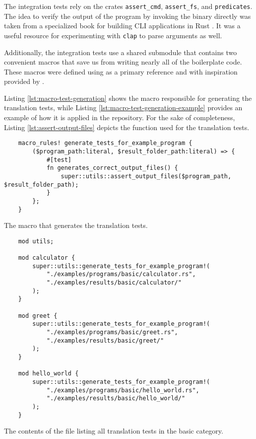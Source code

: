The integration tests rely on the crates \texttt{assert\_cmd}, \texttt{assert\_fs},
and \texttt{predicates}.
The idea to verify the output of the program by invoking the binary directly was
taken from a specialized book for building \acrshort{CLI} applications in Rust \cite[Chap. 1.6]{rust-cli-book}.
It was a useful resource for experimenting with \texttt{clap} to parse arguments as well.

Additionally, the integration tests use a shared submodule \cite[Chap. 11.3]{rust-book}
that contains two convenient macros that save us from writing nearly all of the boilerplate code.
These macros were defined using \cite{rust-macros} as a primary reference
and with inspiration provided by \cite{oaten2023}.

Listing \ref{lst:macro-test-generation} shows the macro responsible for generating the translation tests,
while Listing \ref{lst:macro-test-generation-example} provides an example of how it is applied
in the repository. For the sake of completeness, Listing \ref{lst:assert-output-files}
depicts the function used for the translation tests.

\begin{listing}[!htbp]
    \begin{verbatim}
    macro_rules! generate_tests_for_example_program {
        ($program_path:literal, $result_folder_path:literal) => {
            #[test]
            fn generates_correct_output_files() {
                super::utils::assert_output_files($program_path, $result_folder_path);
            }
        };
    }        
    \end{verbatim}
    \caption{The macro that generates the translation tests.}
    \label{lst:macro-test-generation}
\end{listing}


\begin{listing}[!htbp]
    \begin{verbatim}
    mod utils;
    
    mod calculator {
        super::utils::generate_tests_for_example_program!(
            "./examples/programs/basic/calculator.rs",
            "./examples/results/basic/calculator/"
        );
    }
    
    mod greet {
        super::utils::generate_tests_for_example_program!(
            "./examples/programs/basic/greet.rs",
            "./examples/results/basic/greet/"
        );
    }
    
    mod hello_world {
        super::utils::generate_tests_for_example_program!(
            "./examples/programs/basic/hello_world.rs",
            "./examples/results/basic/hello_world/"
        );
    }    
    \end{verbatim}
    \caption{The contents of the file  listing all translation tests in the basic category.}
    \label{lst:macro-test-generation-example}
\end{listing}

